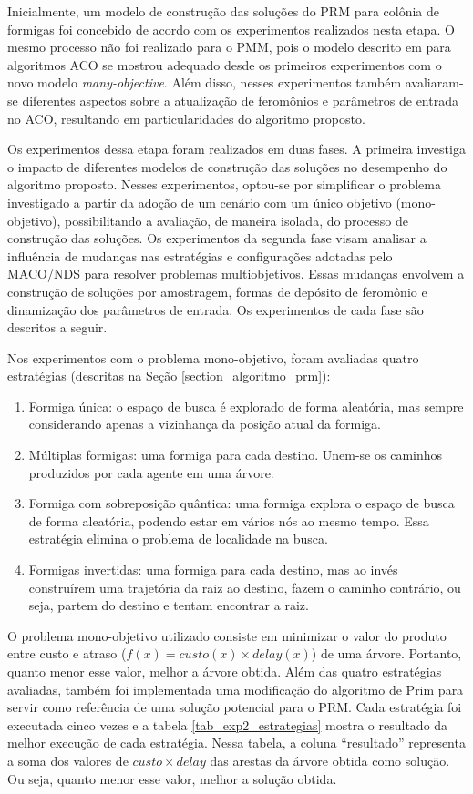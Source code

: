 Inicialmente, um modelo de construção das soluções do PRM para colônia de formigas foi concebido de acordo com os experimentos realizados nesta etapa. O mesmo processo não foi realizado para o PMM, pois o modelo descrito em \cite{Alaya2004} para algoritmos ACO se mostrou adequado desde os primeiros experimentos com o novo modelo \textit{many-objective}. Além disso, nesses experimentos também avaliaram-se diferentes aspectos sobre a atualização de feromônios e parâmetros de entrada no ACO, resultando em particularidades do algoritmo proposto.

Os experimentos dessa etapa foram realizados em duas fases. A primeira investiga o impacto de diferentes modelos de construção das soluções no desempenho do algoritmo proposto. Nesses experimentos, optou-se por simplificar o problema investigado a partir da adoção de um cenário com um único objetivo (mono-objetivo), possibilitando a avaliação, de maneira isolada, do processo de construção das soluções. Os experimentos da segunda fase visam analisar a influência de mudanças nas estratégias e configurações adotadas pelo MACO/NDS para resolver problemas multiobjetivos. Essas mudanças envolvem a construção de soluções por amostragem, formas de depósito de feromônio e dinamização dos parâmetros de entrada. Os experimentos de cada fase são descritos a seguir.

Nos experimentos com o problema mono-objetivo, foram avaliadas quatro estratégias (descritas na Seção \ref{section_algoritmo_prm}):

\begin{enumerate}
	\item Formiga única: o espaço de busca é explorado de forma aleatória, mas sempre considerando apenas a vizinhança da posição atual da formiga.
	\item Múltiplas formigas: uma formiga para cada destino. Unem-se os caminhos produzidos por cada agente em uma árvore.
	\item Formiga com sobreposição quântica: uma formiga explora o espaço de busca de forma aleatória, podendo estar em vários nós ao mesmo tempo. Essa estratégia elimina o problema de localidade na busca.
	\item Formigas invertidas: uma formiga para cada destino, mas ao invés construírem uma trajetória da raiz ao destino, fazem o caminho contrário, ou seja, partem do destino e tentam encontrar a raiz.
\end{enumerate}

O problema mono-objetivo utilizado consiste em minimizar o valor do produto entre custo e atraso ($f(x) = custo(x) \times delay(x)$) de uma árvore. Portanto, quanto menor esse valor, melhor a árvore obtida. Além das quatro estratégias avaliadas, também foi implementada uma modificação do algoritmo de Prim \cite{Prim1957} para servir como referência de uma solução potencial para o PRM. Cada estratégia foi executada cinco vezes e a tabela \ref{tab_exp2_estrategias} mostra o resultado da melhor execução de cada estratégia. Nessa tabela, a coluna ``resultado'' representa a soma dos valores de $custo \times delay$ das arestas da árvore obtida como solução. Ou seja, quanto menor esse valor, melhor a solução obtida.

